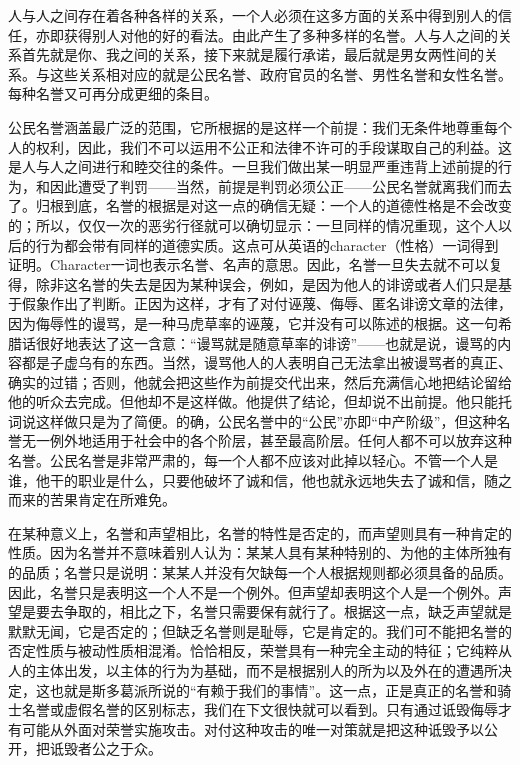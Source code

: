 \documentclass[12pt,oneside]{book}
\begin{document}
人与人之间存在着各种各样的关系，一个人必须在这多方面的关系中得到别人的信任，亦即获得别人对他的好的看法。由此产生了多种多样的名誉。人与人之间的关系首先就是你、我之间的关系，接下来就是履行承诺，最后就是男女两性间的关系。与这些关系相对应的就是公民名誉、政府官员的名誉、男性名誉和女性名誉。每种名誉又可再分成更细的条目。 

公民名誉涵盖最广泛的范围，它所根据的是这样一个前提：我们无条件地尊重每个人的权利，因此，我们不可以运用不公正和法律不许可的手段谋取自己的利益。这是人与人之间进行和睦交往的条件。一旦我们做出某一明显严重违背上述前提的行为，和因此遭受了判罚——当然，前提是判罚必须公正——公民名誉就离我们而去了。归根到底，名誉的根据是对这一点的确信无疑：一个人的道德性格是不会改变的；所以，仅仅一次的恶劣行径就可以确切显示：一旦同样的情况重现，这个人以后的行为都会带有同样的道德实质。这点可从英语的character（性格）一词得到证明。Character一词也表示名誉、名声的意思。因此，名誉一旦失去就不可以复得，除非这名誉的失去是因为某种误会，例如，是因为他人的诽谤或者人们只是基于假象作出了判断。正因为这样，才有了对付诬蔑、侮辱、匿名诽谤文章的法律，因为侮辱性的谩骂，是一种马虎草率的诬蔑，它并没有可以陈述的根据。这一句希腊话很好地表达了这一含意：“谩骂就是随意草率的诽谤”——也就是说，谩骂的内容都是子虚乌有的东西。当然，谩骂他人的人表明自己无法拿出被谩骂者的真正、确实的过错；否则，他就会把这些作为前提交代出来，然后充满信心地把结论留给他的听众去完成。但他却不是这样做。他提供了结论，但却说不出前提。他只能托词说这样做只是为了简便。的确，公民名誉中的“公民”亦即“中产阶级”，但这种名誉无一例外地适用于社会中的各个阶层，甚至最高阶层。任何人都不可以放弃这种名誉。公民名誉是非常严肃的，每一个人都不应该对此掉以轻心。不管一个人是谁，他干的职业是什么，只要他破坏了诚和信，他也就永远地失去了诚和信，随之而来的苦果肯定在所难免。 

在某种意义上，名誉和声望相比，名誉的特性是否定的，而声望则具有一种肯定的性质。因为名誉并不意味着别人认为：某某人具有某种特别的、为他的主体所独有的品质；名誉只是说明：某某人并没有欠缺每一个人根据规则都必须具备的品质。因此，名誉只是表明这一个人不是一个例外。但声望却表明这个人是一个例外。声望是要去争取的，相比之下，名誉只需要保有就行了。根据这一点，缺乏声望就是默默无闻，它是否定的；但缺乏名誉则是耻辱，它是肯定的。我们可不能把名誉的否定性质与被动性质相混淆。恰恰相反，荣誉具有一种完全主动的特征；它纯粹从人的主体出发，以主体的行为为基础，而不是根据别人的所为以及外在的遭遇所决定，这也就是斯多葛派所说的“有赖于我们的事情”。这一点，正是真正的名誉和骑士名誉或虚假名誉的区别标志，我们在下文很快就可以看到。只有通过诋毁侮辱才有可能从外面对荣誉实施攻击。对付这种攻击的唯一对策就是把这种诋毁予以公开，把诋毁者公之于众。 
\end{document}

